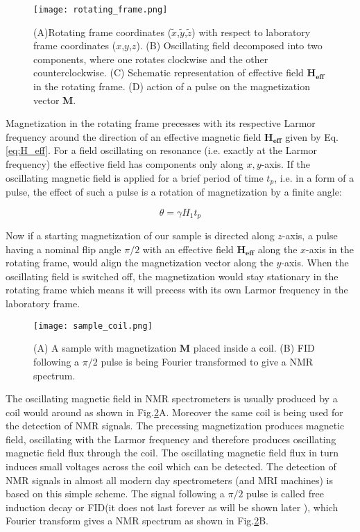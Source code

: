 \documentclass[a4paper, 12pt]{article}
\begin{document}
\begin{figure}[ht]
\caption{(A)Rotating frame coordinates ($\tilde{x}$,$\tilde{y}$,$\tilde{z}$) with respect to laboratory frame coordinates ($x$,$y$,$z$). (B) Oscillating field decomposed into two components, where one rotates clockwise and the other counterclockwise. (C) Schematic representation of effective field $\bm{H_{eff}}$ in the rotating frame. (D) action of a pulse on the magnetization vector $\bm{M}$.}
\label{fig:rot_frame}
\centering
\texttt{[image: rotating\_frame.png]}
\end{figure}

 Magnetization in the rotating frame precesses with its respective Larmor frequency around the direction of an effective magnetic field $\bm{H_{eff}}$ given by Eq.\ref{eq:H_eff}. For a field oscillating on resonance (i.e. exactly at the Larmor frequency) the effective field has components only along $x,y$-axis. If the oscillating magnetic field is applied for a brief period of time $t_p$, i.e. in a form of a pulse, the effect of such a pulse is a rotation of magnetization by a finite angle:

\begin{equation}
\theta = \gamma H_1 t_p
\end{equation}

Now if a starting magnetization of our sample is directed along $z$-axis, a pulse having a nominal flip angle $\pi/2$ with an effective field $\bm{H_{eff}}$ along the $x$-axis in the rotating frame, would align the magnetization vector along the $y$-axis. When the oscillating field is switched off, the magnetization would stay stationary in the rotating frame which means it will precess with its own Larmor frequency in the laboratory frame.

\begin{figure}[ht]
\caption{(A) A sample with magnetization $\bm{M}$ placed inside a coil. (B) FID following a $\pi/2$ pulse is being Fourier transformed to give a NMR spectrum.}
\label{fig:sample_coil}
\centering
\texttt{[image: sample\_coil.png]}
\end{figure}

The oscillating magnetic field in NMR spectrometers is usually produced by a coil would around as shown in Fig.\ref{fig:sample_coil}A. Moreover the same coil is being used for the detection of NMR signals. The precessing magnetization produces magnetic field, oscillating with the Larmor frequency and therefore produces oscillating  magnetic field flux through the coil. The oscillating magnetic field flux in turn induces small voltages across the coil which can be detected. The detection of NMR signals in almost all modern day spectrometers (and MRI machines) is based on this simple scheme. The signal following a $\pi/2$ pulse is called free induction decay or FID(it does not last forever as will be shown later ), which Fourier transform gives a NMR spectrum as shown in Fig.\ref{fig:sample_coil}B.
\end{document}
